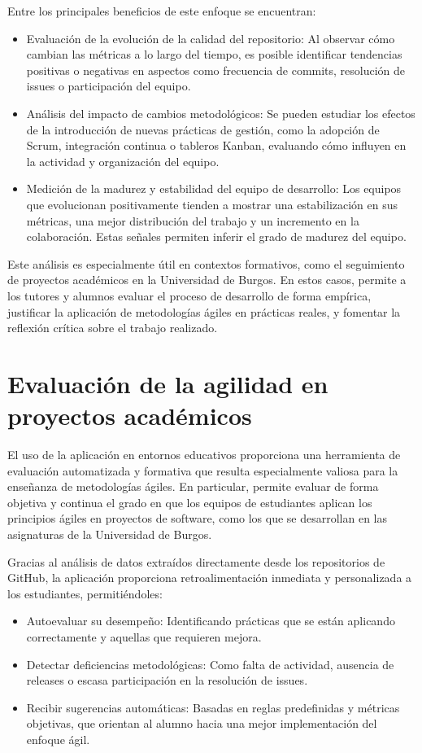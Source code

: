 Entre los principales beneficios de este enfoque se encuentran:

\begin{itemize}
\item Evaluación de la evolución de la calidad del repositorio: Al observar cómo cambian las métricas a lo largo del tiempo, es posible identificar tendencias positivas o negativas en aspectos como frecuencia de commits, resolución de issues o participación del equipo.
\item Análisis del impacto de cambios metodológicos: Se pueden estudiar los efectos de la introducción de nuevas prácticas de gestión, como la adopción de Scrum, integración continua o tableros Kanban, evaluando cómo influyen en la actividad y organización del equipo.
\item Medición de la madurez y estabilidad del equipo de desarrollo: Los equipos que evolucionan positivamente tienden a mostrar una estabilización en sus métricas, una mejor distribución del trabajo y un incremento en la colaboración. Estas señales permiten inferir el grado de madurez del equipo.
\end{itemize}

Este análisis es especialmente útil en contextos formativos, como el seguimiento de proyectos académicos en la Universidad de Burgos. En estos casos, permite a los tutores y alumnos evaluar el proceso de desarrollo de forma empírica, justificar la aplicación de metodologías ágiles en prácticas reales, y fomentar la reflexión crítica sobre el trabajo realizado.

\section{Evaluación de la agilidad en proyectos académicos}
El uso de la aplicación en entornos educativos proporciona una herramienta de evaluación automatizada y formativa que resulta especialmente valiosa para la enseñanza de metodologías ágiles. En particular, permite evaluar de forma objetiva y continua el grado en que los equipos de estudiantes aplican los principios ágiles en proyectos de software, como los que se desarrollan en las asignaturas de la Universidad de Burgos.

Gracias al análisis de datos extraídos directamente desde los repositorios de GitHub, la aplicación proporciona retroalimentación inmediata y personalizada a los estudiantes, permitiéndoles:

\begin{itemize}
\item Autoevaluar su desempeño: Identificando prácticas que se están aplicando correctamente y aquellas que requieren mejora.
\item Detectar deficiencias metodológicas: Como falta de actividad, ausencia de releases o escasa participación en la resolución de issues.
\item Recibir sugerencias automáticas: Basadas en reglas predefinidas y métricas objetivas, que orientan al alumno hacia una mejor implementación del enfoque ágil.
\end{itemize}

